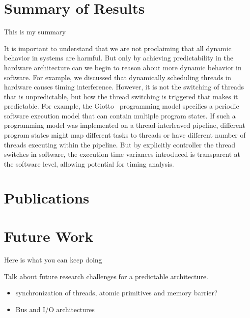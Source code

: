 \section{Summary of Results}

This is my summary

It is important to understand that we are not proclaiming that all dynamic behavior in systems are harmful. 
But only by achieving predictability in the hardware architecture can we begin to reason about more dynamic behavior in software.
For example, we discussed that dynamically scheduling threads in hardware causes timing interference. 
However, it is not the switching of threads that is unpredictable, but how the thread switching is triggered that makes it predictable.   
For example, the Giotto~\cite{henzinger_giotto} programming model specifies a periodic software execution model that can contain multiple program states. 
If such a programming model was implemented on a thread-interleaved pipeline, different program states might map different tasks to threads or have different number of threads executing within the pipeline.
But by explicitly controller the thread switches in software, the execution time variances introduced is transparent at the software level, allowing potential for timing analysis.


\section{Publications}

\section{Future Work}

Here is what you can keep doing

Talk about future research challenges for a predictable architecture.
\begin{itemize}
  \item synchronization of threads, atomic primitives and memory barrier?
  \item Bus and I/O architectures
\end{itemize}
